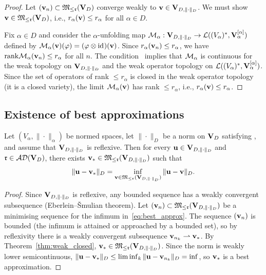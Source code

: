 \begin{proof}
Let $(\mathbf{v}_n) \subset \mathfrak{M}_{\leq\mathfrak{r}}(\mathbf{V}_D)$ converge weakly to
$\mathbf{v} \in \mathbf{V}_{D,\|\cdot\|_D}$. We must show $\mathbf{v} \in \mathfrak{M}_{\leq\mathfrak{r}}(\mathbf{V}_D)$,
i.e., $r_\alpha(\mathbf{v}) \leq r_\alpha$ for all $\alpha \in D$.

Fix $\alpha \in D$ and consider the $\alpha$-unfolding map
$\mathcal{M}_{\alpha}: \mathbf{V}_{D,\|\cdot\|_D} \to \mathcal{L}((V_\alpha)^*, \mathbf{V}_\alpha^{[\alpha]})$
defined by $\mathcal{M}_{\alpha}(\mathbf{v})(\varphi) = (\varphi \otimes \mathrm{id}_{})(\mathbf{v})$.
Since $r_\alpha(\mathbf{v}_n) \leq r_\alpha$, we have
$\mathrm{rank} \mathcal{M}_{\alpha}(\mathbf{v}_n) \leq r_\alpha$ for all $n$. The condition
\condINJ\ implies that $\mathcal{M}_{\alpha}$ is continuous for the weak
topology on $\mathbf{V}_{D,\|\cdot\|_D}$ and the weak operator topology on
$\mathcal{L}((V_\alpha)^*, \mathbf{V}_\alpha^{[\alpha]})$. Since the set of
operators of rank $\leq r_\alpha$ is closed in the weak operator topology
(it is a closed variety), the limit $\mathcal{M}_{\alpha}(\mathbf{v})$ has rank
$\leq r_\alpha$, i.e., $r_\alpha(\mathbf{v}) \leq r_\alpha$.
\end{proof}

\subsection*{Existence of best approximations}

\begin{theorem}
\label{thm:best_approx_tucker}
Let $(V_\alpha, \|\cdot\|_\alpha)$ be normed spaces, let $\|\cdot\|_D$
be a norm on $\mathbf{V}_D$ satisfying \condINJ, and assume that $\mathbf{V}_{D,\|\cdot\|_D}$ is
reflexive. Then for every $\mathbf{u} \in \mathbf{V}_{D,\|\cdot\|_D}$ and $\mathfrak{r} \in \mathcal{AD}(\mathbf{V}_D)$,
there exists $\mathbf{v}_* \in \mathfrak{M}_{\leq\mathfrak{r}}(\mathbf{V}_{D,\|\cdot\|_D})$ such that
\begin{equation}
\label{eq:best_approx}
    \|\mathbf{u} - \mathbf{v}_*\|_D = \inf_{\mathbf{v} \in \mathfrak{M}_{\leq\mathfrak{r}}(\mathbf{V}_{D,\|\cdot\|_D})}
    \|\mathbf{u} - \mathbf{v}\|_D.
\end{equation}
\end{theorem}

\begin{proof}
Since $\mathbf{V}_{D,\|\cdot\|_D}$ is reflexive, any bounded sequence has a weakly
convergent subsequence (Eberlein--Šmulian theorem). Let
$(\mathbf{v}_n) \subset \mathfrak{M}_{\leq\mathfrak{r}}(\mathbf{V}_{D,\|\cdot\|_D})$ be a minimising sequence
for the infimum in~\eqref{eq:best_approx}. The sequence $(\mathbf{v}_n)$ is
bounded (the infimum is attained or approached by a bounded set), so
by reflexivity there is a weakly convergent subsequence
$\mathbf{v}_{n_k} \rightharpoonup \mathbf{v}_*$. By
Theorem~\ref{thm:weak_closed}, $\mathbf{v}_* \in \mathfrak{M}_{\leq\mathfrak{r}}(\mathbf{V}_{D,\|\cdot\|_D})$.
Since the norm is weakly lower semicontinuous,
$\|\mathbf{u} - \mathbf{v}_*\|_D \leq \liminf_k \|\mathbf{u} - \mathbf{v}_{n_k}\|_D = \inf$,
so $\mathbf{v}_*$ is a best approximation.
\end{proof}

